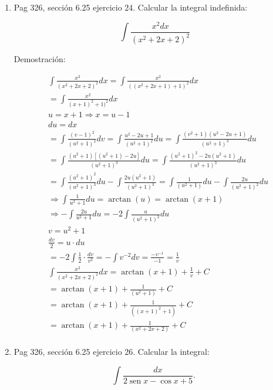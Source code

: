 \documentclass{report}
\begin{document}
\begin{enumerate}
        \item Pag 326, sección 6.25 ejercicio 24. Calcular la integral indefinida:
        
        \[
        \int \frac{x^{2} dx}{\left(x^{2}+2 x+2\right)^{2}}
        \]
        
        Demostración:
        
        \[
        \begin{aligned}
        & \int \frac{x^2}{\left(x^2+2 x+2\right)^2} dx = \int \frac{x^2}{((x^2+2 x+1)+1)^2} dx \\
        & = \int \frac{x^2}{(x+1)^2+1)^2} dx \\
        & u = x + 1 \Rightarrow x = u - 1 \\
        & du = dx \\
        & = \int \frac{(v-1)^2}{(u^2+1)^2} dv = \int \frac{u^2-2 u+1}{(u^2+1)^2} du = \int \frac{(v^2+1)(u^2-2 u+1)}{(u^2+1)^3} du \\
        & = \int \frac{(u^2+1)[(u^2+1)-2 u]}{(u^2+1)^3} du = \int \frac{(u^2+1)^2-2 u(u^2+1)}{(u^2+1)^3} du \\
        & = \int \frac{(u^2+1)^2}{(u^2+1)^3} du - \int \frac{2 u(u^2+1)}{(u^2+1)^3} = \int \frac{1}{(u^2+1)} du - \int \frac{2 u}{(u^2+1)^2} du \\
        & \Rightarrow \int \frac{1}{u^2+1} du = \arctan(u) = \arctan(x+1) \\
        & \Rightarrow -\int \frac{2 u}{u^2+1} du = -2 \int \frac{u}{(u^2+1)^2} du \\
        & v = u^2+1 \\
        & \frac{dv}{2} = u \cdot du \\
        & = -2 \int \frac{1}{2} \cdot \frac{dv}{v^2} = -\int v^{-2} dv = \frac{-v^{-1}}{-1} = \frac{1}{v} \\
        & \int \frac{x^2}{\left(x^2+2 x+2\right)^2} dx = \arctan(x+1) + \frac{1}{v} + C \\
        & = \arctan(x+1) + \frac{1}{\left(u^2+1\right)} + C \\
        & = \arctan(x+1) + \frac{1}{\left((x+1)^2+1\right)} + C \\
        & = \arctan(x+1) + \frac{1}{\left(x^2+2 x+2\right)} + C \\
        \end{aligned}
        \]
        
        \item Pag 326, sección 6.25 ejercicio 26. Calcular la integral:
        
        $$
         \int \frac{d x}{2 \operatorname{sen} x-\cos x+5} \text {. }
        $$
        

\end{enumerate}
\end{document}
